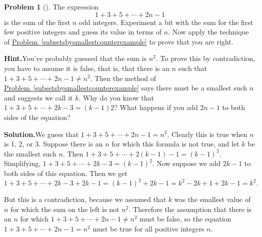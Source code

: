 \documentclass[10pt,]{book}
\theoremstyle{plain}
\theoremstyle{definition}
\newtheorem{activity}[project]{Problem}
\theoremstyle{definition}
\numberwithin{equation}{chapter}
\begin{document}
\begin{activity}[]\label{sumodd}
The expression%
\begin{equation*}
1+3+5+\cdots+2n-1
\end{equation*}
is the sum of the first \(n\) odd integers. Experiment a bit with the sum for the first few positive integers and guess its value in terms of \(n\). Now apply the technique of \hyperref[subsetsbysmallestcounterexample]{Problem~\ref{subsetsbysmallestcounterexample}} to prove that you are right.%
\par\medskip\noindent%
\textbf{Hint.}\quad You've probably guessed that the sum is \(n^2\). To prove this by contradiction, you have to assume it is false, that is, that there is an \(n\) such that \(1 + 3 + 5 + \cdots + 2n - 1 \ne n^2\). Then the method of \hyperref[subsetsbysmallestcounterexample]{Problem~\ref{subsetsbysmallestcounterexample}} says there must be a smallest such \(n\) and suggests we call it \(k\). Why do you know that \(1 + 3 + 5 + \cdots + 2k - 3 = (k-1)2\)? What happens if you add \(2n-1\) to both  sides of the equation?%
\par\medskip\noindent%
\textbf{Solution.}\quad We guess that \(1+3+5+\cdots+2n-1=n^2\). Clearly this is true when \(n\) is 1, 2, or 3. Suppose there is an \(n\) for which this formula is not true, and let \(k\) be the smallest such \(n\). Then \(1+3+5+\cdots+2(k-1)-1 =
(k-1)^2\). Simplifying, \(1+3+5+\cdots+2k-3 =
(k-1)^2\). Now suppose we add \(2k-1\) to both sides of this equation. Then we get%
\begin{equation*}
1+3+5+\cdots+2k-3 +2k-1 =
(k-1)^2+2k-1 = k^2-2k+1+2k-1=k^2.
\end{equation*}
%
\par
But this is a contradiction, because we assumed that \(k\) was the smallest value of \(n\) for which the sum on the left is not \(n^2\). Therefore the assumption that there is an \(n\) for which \(1+3+5+\cdots+2n-1
\not=n^2\) must be false, so the equation \(1+3+5+\cdots+2n-1=n^2\) must be true for all positive integers \(n\).%
\end{activity}
\end{document}
